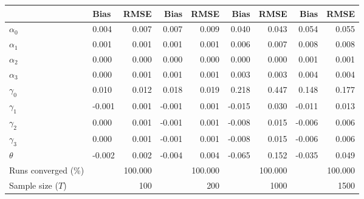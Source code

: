 
\begin{tabular}[t]{llrrrrrrr}
\toprule
  & Bias & RMSE & Bias & RMSE & Bias & RMSE & Bias & RMSE\\
\midrule
$\alpha_{0}$ & 0.004 & 0.007 & 0.007 & 0.009 & 0.040 & 0.043 & 0.054 & 0.055\\
$\alpha_{1}$ & 0.001 & 0.001 & 0.001 & 0.001 & 0.006 & 0.007 & 0.008 & 0.008\\
$\alpha_{2}$ & 0.000 & 0.000 & 0.000 & 0.000 & 0.000 & 0.000 & 0.001 & 0.001\\
$\alpha_{3}$ & 0.000 & 0.001 & 0.001 & 0.001 & 0.003 & 0.003 & 0.004 & 0.004\\
$\gamma_{0}$ & 0.010 & 0.012 & 0.018 & 0.019 & 0.218 & 0.447 & 0.148 & 0.177\\
$\gamma_{1}$ & -0.001 & 0.001 & -0.001 & 0.001 & -0.015 & 0.030 & -0.011 & 0.013\\
$\gamma_{2}$ & 0.000 & 0.001 & -0.001 & 0.001 & -0.008 & 0.015 & -0.006 & 0.006\\
$\gamma_{3}$ & 0.000 & 0.001 & -0.001 & 0.001 & -0.008 & 0.015 & -0.006 & 0.006\\
$\theta$ & -0.002 & 0.002 & -0.004 & 0.004 & -0.065 & 0.152 & -0.035 & 0.049\\
Runs converged (\%) &  & 100.000 &  & 100.000 &  & 100.000 &  & 100.000\\
Sample size ($T$) &  & 100 &  & 200 &  & 1000 &  & 1500\\
\bottomrule
\end{tabular}
